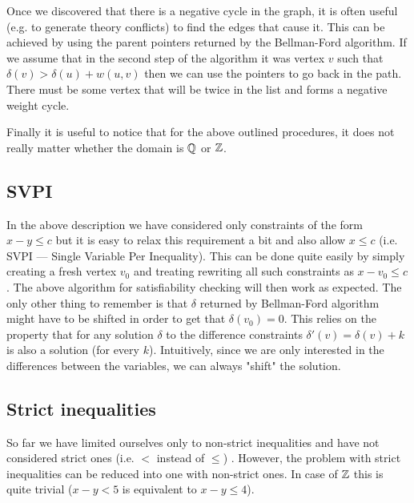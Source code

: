 Once we discovered that there is a negative cycle in the graph, it is often
useful (e.g. to generate theory conflicts) to find the edges that cause it. This
can be achieved by using the parent pointers returned by the Bellman-Ford
algorithm. If we assume that in the second step of the algorithm it was vertex
$v$ such that $\delta(v) > \delta(u) + w(u, v)$
then we can use the pointers to go back in the path. There must be some vertex
that will be twice in the list and forms a negative weight cycle.

Finally it is useful to notice that for the above outlined procedures, it does
not really matter whether the domain is $\mathbb{Q}$ or $\mathbb{Z}$.

\subsection{SVPI}

In the above description we have considered only constraints of the form
$x - y \leq c$ but it is easy to relax this requirement a bit and also allow
$x \leq c$ (i.e. SVPI --- Single Variable Per Inequality). This can be done
quite easily by simply creating a fresh vertex $v_0$ and treating rewriting all
such constraints as $x - v_0 \leq c$. The above algorithm for satisfiability
checking will then work as expected. The only other thing to remember is that
$\delta$ returned by Bellman-Ford algorithm might have to be shifted in order to
get that $\delta(v_0) = 0$. This relies on the property that for any solution
$\delta$ to the difference constraints $\delta'(v) = \delta(v) + k$ is also a
solution (for every $k$). Intuitively, since we are only interested in the
differences between the variables, we can always "shift" the solution.

\subsection{Strict inequalities}

So far we have limited ourselves only to non-strict inequalities and have not
considered strict ones (i.e. $<$ instead of $\leq$) . However, the problem with
strict inequalities can be reduced into one with non-strict ones. In case of
$\mathbb{Z}$ this is quite trivial ($x - y < 5$ is equivalent to $x - y \leq 4$).

